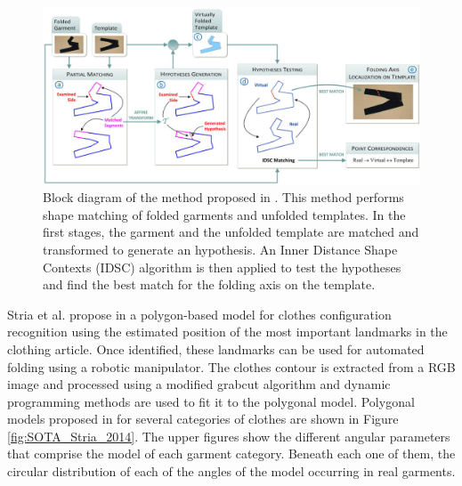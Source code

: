 \begin{figure}[thpb]
    \centering
    \includegraphics[width=\textwidth]{figures/SOTA_Mariolis_2015.png}
    \caption[Block diagram of the method proposed by Mariolis et al.]
    {Block diagram of the method proposed in \cite{Mariolis2015}. This method performs shape matching of folded garments and unfolded templates. In the first stages, the garment and the unfolded template are matched and transformed to generate an hypothesis. An Inner Distance Shape Contexts (IDSC) algorithm is then applied to test the hypotheses and find the best match for the folding axis on the template.}
    \label{fig:SOTA_Mariolis_2015}
\end{figure}

Stria et al. propose in \cite{Stria2014, Stria2014IROS} a polygon-based model for clothes configuration recognition using the estimated position of the most important landmarks in the clothing article. Once identified, these landmarks can be used for automated folding using a robotic manipulator. The clothes contour is extracted from a RGB image and processed using a modified grabcut algorithm and dynamic programming methods are used to fit it to the polygonal model. Polygonal models proposed in \cite{Stria2014} for several categories of clothes are shown in Figure \ref{fig:SOTA_Stria_2014}. The upper figures show the different angular parameters that comprise the model of each garment category. Beneath each one of them, the circular distribution of each of the angles of the model occurring in real garments.

